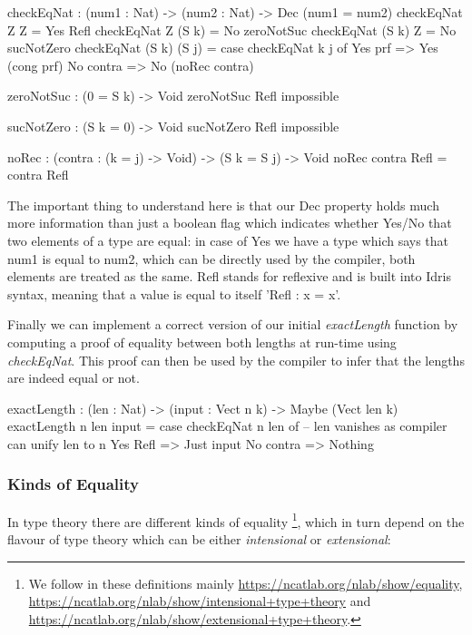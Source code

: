 \begin{HaskellCode}
checkEqNat : (num1 : Nat) -> (num2 : Nat) -> Dec (num1 = num2)
checkEqNat Z Z         = Yes Refl
checkEqNat Z (S k)     = No zeroNotSuc
checkEqNat (S k) Z     = No sucNotZero
checkEqNat (S k) (S j) = case checkEqNat k j of
                              Yes prf   => Yes (cong prf)
                              No contra => No (noRec contra)
                              
zeroNotSuc : (0 = S k) -> Void
zeroNotSuc Refl impossible

sucNotZero : (S k = 0) -> Void
sucNotZero Refl impossible

noRec : (contra : (k = j) -> Void) -> (S k = S j) -> Void
noRec contra Refl = contra Refl
\end{HaskellCode}  
                            

The important thing to understand here is that our Dec property holds much more information than just a boolean flag which indicates whether Yes/No that two elements of a type are equal: in case of Yes we have a type which says that num1 is equal to num2, which can be directly used by the compiler, both elements are treated as the same. Refl stands for reflexive and is built into Idris syntax, meaning that a value is equal to itself 'Refl : x = x'. %

Finally we can implement a correct version of our initial \textit{exactLength} function by computing a proof of equality between both lengths at run-time using \textit{checkEqNat}. This proof can then be used by the compiler to infer that the lengths are indeed equal or not.

\begin{HaskellCode}
exactLength : (len : Nat) -> (input : Vect n k) -> Maybe (Vect len k)
exactLength {n} len input = case checkEqNat n len of
                                 -- len vanishes as compiler can unify len to n
                                 Yes Refl  => Just input 
                                 No contra => Nothing
\end{HaskellCode} 

\subsubsection{Kinds of Equality}
In type theory there are different kinds of equality \footnote{We follow in these definitions mainly \url{https://ncatlab.org/nlab/show/equality}, \url{https://ncatlab.org/nlab/show/intensional+type+theory} and \url{https://ncatlab.org/nlab/show/extensional+type+theory}.}, which in turn depend on the flavour of type theory which can be either \textit{intensional} or \textit{extensional}:

